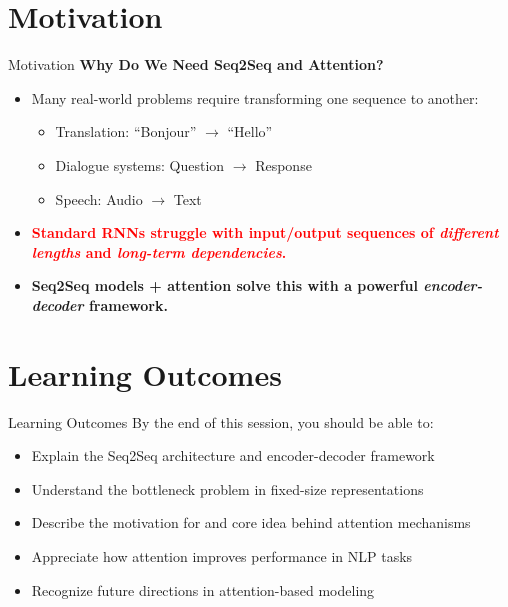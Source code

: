 \section{Motivation}
\begin{frame}{Motivation}
    \textbf{Why Do We Need Seq2Seq and Attention?}

    \begin{itemize}
        \setlength{\itemsep}{1em}
        \item Many real-world problems require transforming one sequence to another:
        \begin{itemize}
            \setlength{\itemsep}{0.5em}
            \item Translation: ``Bonjour'' $\rightarrow$ ``Hello''
            \item Dialogue systems: Question $\rightarrow$ Response
            \item Speech: Audio $\rightarrow$ Text
        \end{itemize}
        \item[] \textcolor{red}{\textbf{Standard RNNs struggle with input/output sequences of \emph{different lengths} and \emph{long-term dependencies}.}}
        \item[] \textcolor{green!50!black}{\textbf{Seq2Seq models + attention solve this with a powerful \emph{encoder-decoder} framework.}}
    \end{itemize}
\end{frame}

\section{Learning Outcomes}
\begin{frame}{Learning Outcomes}
    By the end of this session, you should be able to:
    \begin{itemize}
        \setlength{\itemsep}{1em}
        \item Explain the Seq2Seq architecture and encoder-decoder framework
        \item Understand the bottleneck problem in fixed-size representations
        \item Describe the motivation for and core idea behind attention mechanisms
        \item Appreciate how attention improves performance in NLP tasks
        \item Recognize future directions in attention-based modeling
    \end{itemize}
\end{frame}


